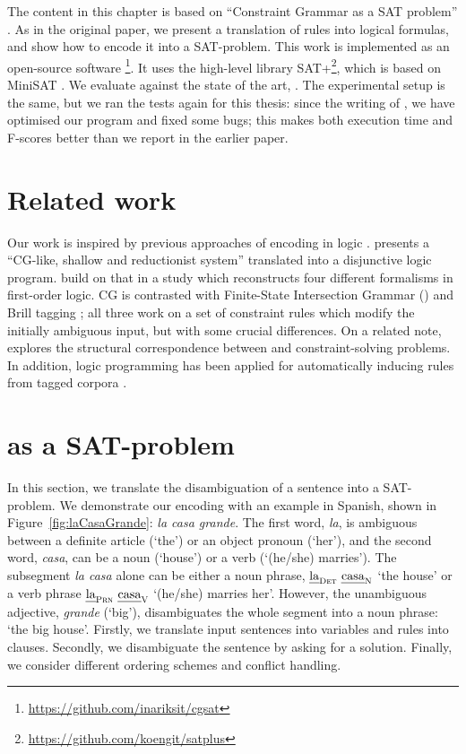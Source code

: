 The content in this chapter is based on ``Constraint Grammar as a SAT
problem'' \cite{listenmaa_claessen2015}.  As in the original paper, we
present a translation of \onlycg{} rules into logical formulas, and
show how to encode it into a SAT-problem.  This work is implemented as
an open-source software
\satcg{}\footnote{\url{https://github.com/inariksit/cgsat}}. It uses
the high-level library
SAT+\footnote{\url{https://github.com/koengit/satplus}}, which is
based on MiniSAT \cite{een04sat}.  We evaluate \satcg{} against the
state of the art, .  The experimental setup is the same, but
we ran the tests again for this thesis: since the writing of
\citet{listenmaa_claessen2015}, we have optimised our program and
fixed some bugs; this makes both execution time and F-scores better
than we report in the earlier paper.


\section{Related work}\label{encoding-in-logic}

Our work is inspired by previous approaches of encoding \onlycg{} in logic \cite{lager98, lager_nivre01}.
\citet{lager98} presents a ``CG-like, shallow and reductionist system'' translated into a disjunctive logic program.
\citet{lager_nivre01} build on that in a study which reconstructs
four different formalisms in first-order logic.
CG is contrasted with Finite-State Intersection Grammar (\fsig) \cite{koskenniemi90}
and Brill tagging \cite{brill1995}; all three work on a set of constraint rules
which modify the initially ambiguous input, but with some crucial differences.
On a related note, \citet{yli-jyra2001} explores the structural correspondence
between \fsig{} and constraint-solving problems.
In addition, logic programming has been applied for automatically inducing \onlycg{} rules from tagged corpora \cite{lindberg_eineborg98ilp,asfrent14,lager01transformation}.


\section{\onlycg{} as a SAT-problem}
\label{sec:CGSAT}

In this section, we translate the disambiguation of a sentence into a SAT-problem.
We demonstrate our encoding with an example in Spanish, shown in Figure~\ref{fig:laCasaGrande}: {\em la casa grande}. %
The first word, {\em la}, is ambiguous between a definite article (`the') or an object pronoun (`her'), and the second word, {\em casa}, can be a noun (`house') or a verb (`(he/she) marries').
The subsegment {\em la casa} alone can be either a noun phrase, $\text{\em la}_{\text{\sc Det}} \ \text{\em casa}_{\text{\sc N}}$
`the house'  or a verb phrase $\text{\em la}_{\text{\sc Prn}} \ \text{\em casa}_{\text{\sc V}}$   `(he/she) marries her'.
However, the unambiguous adjective, {\em grande} (`big'), disambiguates the whole segment into a noun phrase: `the big house'.
%
Firstly, we translate input sentences into variables and rules into clauses.
Secondly, we disambiguate the sentence by asking for a solution.
Finally, we consider different ordering schemes and conflict handling.


